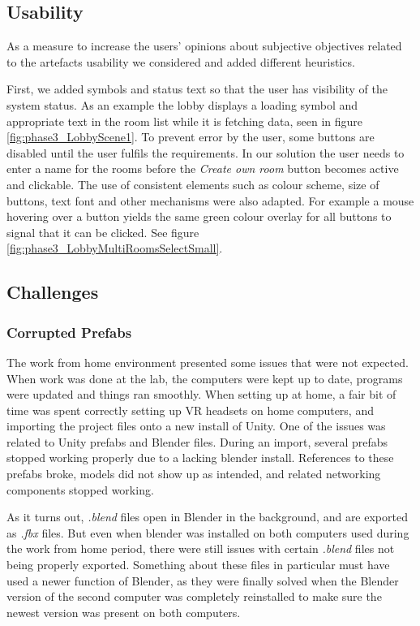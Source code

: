\subsection{Usability}
As a measure to increase the users' opinions about subjective objectives related to the artefacts usability we considered and added different heuristics. 

First, we added symbols and status text so that the user has visibility of the system status. As an example the lobby displays a loading symbol and appropriate text in the room list while it is fetching data, seen in figure \ref{fig:phase3_LobbyScene1}.  
To prevent error by the user, some buttons are disabled until the user fulfils the requirements. In our solution the user needs to enter a name for the rooms before the \textit{Create own room} button becomes active and clickable.
The use of consistent elements such as colour scheme, size of buttons, text font and other mechanisms were also adapted. For example a mouse hovering over a button yields the same green colour overlay for all buttons to signal that it can be clicked. See figure \ref{fig:phase3_LobbyMultiRoomsSelectSmall}. 



\subsection{Challenges}

\subsubsection{Corrupted Prefabs}
The work from home environment presented some issues that were not expected. When work was done at the lab, the computers were kept up to date, programs were updated and things ran smoothly. When setting up at home, a fair bit of time was spent correctly setting up VR headsets on home computers, and importing the project files onto a new install of Unity. One of the issues was related to Unity prefabs and Blender files. During an import, several prefabs stopped working properly due to a lacking blender install. References to these prefabs broke, models did not show up as intended, and related networking components stopped working. 

As it turns out, \textit{.blend} files open in Blender in the background, and are exported as \textit{.fbx} files. But even when blender was installed on both computers used during the work from home period, there were still issues with certain \textit{.blend} files not being properly exported. Something about these files in particular must have used a newer function of Blender, as they were finally solved when the Blender version of the second computer was completely reinstalled to make sure the newest version was present on both computers. 



